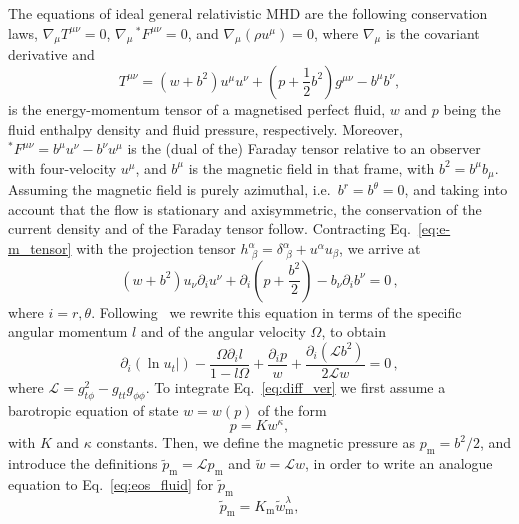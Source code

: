 \documentclass[referee]{aa}
\begin{document}
The equations of ideal general relativistic MHD are the following conservation laws, $\nabla_{\mu} T^{\mu\nu} = 0$, $\nabla_{\mu} \,^\ast F^{\mu\nu} = 0$, and 
$\nabla_{\mu} (\rho u^{\mu}) = 0$, 
where $\nabla_{\mu}$ is the covariant derivative and
\begin{equation}\label{eq:e-m_tensor}
T^{\mu\nu} = (w + b^2)u^{\mu}u^{\nu} + \left(p + \frac{1}{2}b^2\right)g^{\mu\nu} - b^{\mu}b^{\nu},
\end{equation}
is the energy-momentum tensor of a magnetised perfect fluid, $w$ and $p$ being the fluid enthalpy density and fluid pressure, respectively. 
Moreover, $^\ast F^{\mu\nu} = b^{\mu}u^{\nu} - b^{\nu}u^{\mu}$ is the (dual of the) Faraday tensor relative to an observer with 
four-velocity $u^{\mu}$, and $b^{\mu}$ is the magnetic field in that frame, with
$b^2=b^{\mu}b_{\mu}$. Assuming the magnetic field is purely azimuthal, i.e.~$b^r = b^{\theta} = 0$,
and taking into account that the flow is stationary and axisymmetric, the conservation of the current density and of the Faraday tensor follow. Contracting Eq.~\eqref{eq:e-m_tensor} with the projection tensor $h^{\alpha}_{\,\,\beta} = \delta^{\alpha}_{\,\,\beta} + u^{\alpha}u_{\beta}$, we arrive at
\begin{equation}
(w + b^2)u_{\nu}\partial_i u^{\nu} + \partial_i\left(p + \frac{b^2}{2}\right) - b_{\nu}\partial_i b^{\nu}=0\,,
\end{equation}
where $i = r, \theta$. Following~\cite{Komissarov:2006} we rewrite this equation in terms of the specific angular momentum $l$ and of the angular velocity $\Omega$, to obtain
\begin{equation}\label{eq:diff_ver}
\partial_i(\ln u_t|) - \frac{\Omega \partial_i l}{1-l\Omega} + \frac{\partial_i p}{w} + \frac{\partial_i(\mathcal{L}b^2)}{2\mathcal{L}w} = 0\,,
\end{equation}
where $\mathcal{L} = g_{t\phi}^2 - g_{tt}g_{\phi\phi}$.
To integrate Eq.~\eqref{eq:diff_ver} we first assume a barotropic equation of state $w = w(p)$ of the form
\begin{equation}\label{eq:eos_fluid}
p = K w^{\kappa},
\end{equation}
with $K$ and $\kappa$ constants.
Then, we define the magnetic pressure as $p_{\mathrm{m}} = b^2/2$, and introduce the definitions $\tilde{p}_{\mathrm{m}} = \mathcal{L} p_{\mathrm{m}}$ and $\tilde{w} = \mathcal{L} w$, in order to write an analogue equation to Eq.~\eqref{eq:eos_fluid} for $\tilde{p}_{\mathrm{m}}$~\citep{Komissarov:2006}
\begin{equation}\label{eq:eos_mag_tilde}
\tilde{p}_{\mathrm{m}} = K_{\mathrm{m}} \tilde{w}_{\mathrm{m}}^{\lambda
},
\end{equation}
\end{document}
